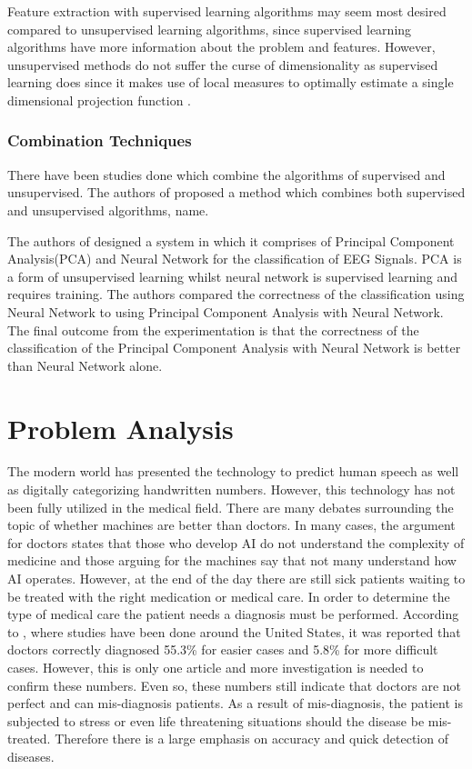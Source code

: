 \documentclass[11pt,twocolumn]{witseiepaper}
\begin{document}
	Feature extraction with supervised learning algorithms may seem most desired compared to unsupervised learning algorithms, since supervised learning algorithms have more information about the problem and features. However, unsupervised methods do not suffer the curse of dimensionality as supervised learning does since it makes use of local measures to optimally estimate a single dimensional projection function \cite{intrator_feature_1992}.
	
	\subsubsection{\textbf{Combination Techniques}}
	There have been studies done which combine the algorithms of supervised and unsupervised. The authors of \cite{neagoe_new_2014} proposed a method which combines both supervised and unsupervised algorithms, name.
	
	The authors of \cite{kottaimalai_eeg_2013} designed a system in which it comprises of Principal Component Analysis(PCA) and Neural Network for the classification of EEG Signals. PCA is a form of unsupervised learning whilst neural network is supervised learning and requires training. The authors compared the correctness of the classification using Neural Network to using Principal Component Analysis with Neural Network. The final outcome from the experimentation is that the correctness of the classification of the Principal Component Analysis with Neural Network is better than Neural Network alone. 
	
	\section{Problem Analysis}
	The modern world has presented the technology to predict human speech as well as digitally categorizing handwritten numbers. However, this technology has not been fully utilized in the medical field. There are many debates surrounding the topic of whether machines are better than doctors. In many cases, the argument for doctors states that those who develop AI do not understand the complexity of medicine and those arguing for the machines say that not many understand how AI operates. However, at the end of the day there are still sick patients waiting to be treated with the right medication or medical care. In order to determine the type of medical care the patient needs a diagnosis must be performed. According to \cite{meyer_physicians_2013}, where studies have been done around the United States, it was reported that doctors correctly diagnosed 55.3\% for easier cases and 5.8\% for more difficult cases. However, this is only one article and more investigation is needed to confirm these numbers. Even so, these numbers still indicate that doctors are not perfect and can mis-diagnosis patients. As a result of mis-diagnosis, the patient is subjected to stress or even life threatening situations should the disease be mis-treated. Therefore there is a large emphasis on accuracy and quick detection of diseases.
	
\end{document}
